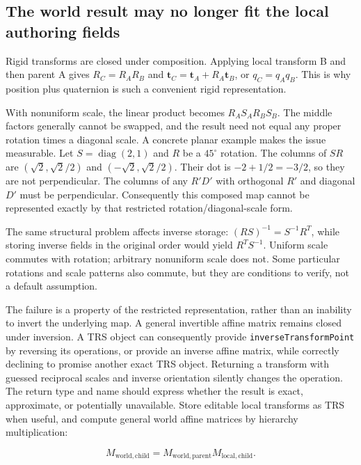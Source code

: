 \subsection{The world result may no longer fit the local authoring fields}\label{01-foundations-i-ch019-the-world-result-may-no-longer-fit-the-local-authoring-fields}

Rigid transforms are closed under composition. Applying local transform B and then parent A gives \(R_C=R_AR_B\) and \(\mathbf t_C=\mathbf t_A+R_A\mathbf t_B\), or \(q_C=q_Aq_B\). This is why position plus quaternion is such a convenient rigid representation.

With nonuniform scale, the linear product becomes \(R_AS_AR_BS_B\). The middle factors generally cannot be swapped, and the result need not equal any proper rotation times a diagonal scale. A concrete planar example makes the issue measurable. Let \(S=\operatorname{diag}(2,1)\) and \(R\) be a \(45^\circ\) rotation. The columns of \(SR\) are \((\sqrt2,\sqrt2/2)\) and \((-\sqrt2,\sqrt2/2)\). Their dot is \(-2+1/2=-3/2\), so they are not perpendicular. The columns of any \(R'D'\) with orthogonal \(R'\) and diagonal \(D'\) must be perpendicular. Consequently this composed map cannot be represented exactly by that restricted rotation/diagonal-scale form.

The same structural problem affects inverse storage: \((RS)^{-1}=S^{-1}R^T\), while storing inverse fields in the original order would yield \(R^TS^{-1}\). Uniform scale commutes with rotation; arbitrary nonuniform scale does not. Some particular rotations and scale patterns also commute, but they are conditions to verify, not a default assumption.

The failure is a property of the restricted representation, rather than an inability to invert the underlying map. A general invertible affine matrix remains closed under inversion. A TRS object can consequently provide \texttt{inverseTransformPoint} by reversing its operations, or provide an inverse affine matrix, while correctly declining to promise another exact TRS object. Returning a transform with guessed reciprocal scales and inverse orientation silently changes the operation. The return type and name should express whether the result is exact, approximate, or potentially unavailable. Store editable local transforms as TRS when useful, and compute general world affine matrices by hierarchy multiplication:

\[
M_{\mathrm{world,child}}=M_{\mathrm{world,parent}}M_{\mathrm{local,child}}.
\]

